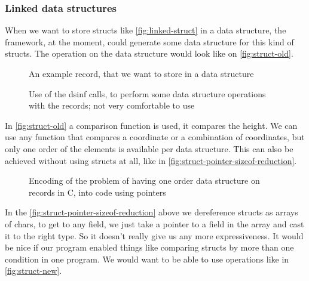 \documentclass[a4paper,11pt]{article}
\begin{document}
		\subsubsection{Linked data structures}

			When we want to store structs like \autoref{fig:linked-struct} in a data structure, the
			framework, at the moment, could generate some data structure for this kind of structs. The
			operation on the data structure would look like on \autoref{fig:struct-old}.

			\begin{figure}
				

				\caption{An example record, that we want to store in a data structure}

				\label{fig:linked-struct}
			\end{figure}

			\begin{figure}
				

				\caption{Use of the dsinf calls, to perform some data structure operations with the
				records; not very comfortable to use}

				\label{fig:struct-old}
			\end{figure}

			In \autoref{fig:struct-old} a comparison function is used, it compares the height. We can use
			any function that compares a coordinate or a combination of coordinates, but only one order of
			the elements is available per data structure. This can also be achieved without using structs at
			all, like in \autoref{fig:struct-pointer-sizeof-reduction}.

			\begin{figure}
				

				\caption{Encoding of the problem of having one order data structure on records in C,
				into code using pointers}

				\label{fig:struct-pointer-sizeof-reduction}
			\end{figure}

			In the \autoref{fig:struct-pointer-sizeof-reduction} above we dereference structs as arrays of
			chars, to get to any field, we just take a pointer to a field in the array and cast it to the
			right type. So it doesn't really give us any more expressiveness. It would be nice if our
			program enabled things like comparing structs by more than one condition in one program. We
			would want to be able to use operations like in \autoref{fig:struct-new}.
\end{document}
